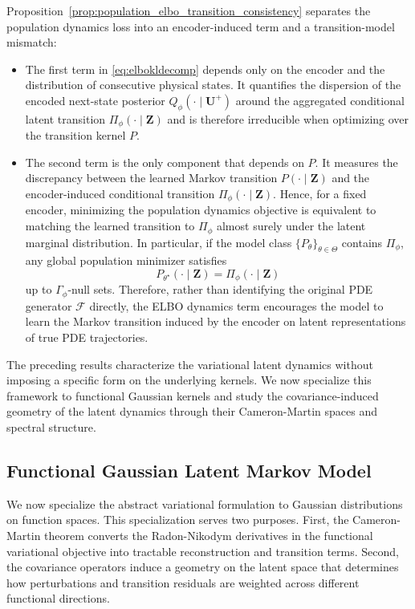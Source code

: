 \documentclass[11pt]{article}
\begin{document}
Proposition~\ref{prop:population_elbo_transition_consistency} separates the population dynamics loss into an encoder-induced term and a transition-model mismatch:
\begin{itemize}
\item The first term in \eqref{eq:elbokldecomp} depends only on the encoder and the distribution of consecutive physical states. It quantifies the dispersion of the encoded next-state posterior $Q_\phi(\cdot\mid\mathbf U^+)$ around the aggregated conditional latent transition $\Pi_\phi(\cdot\mid\mathbf Z)$ and is therefore irreducible when optimizing over the transition kernel $P$.

\item The second term is the only component that depends on $P$. It measures the discrepancy between the learned Markov transition $P(\cdot\mid\mathbf Z)$ and the encoder-induced conditional transition $\Pi_\phi(\cdot\mid\mathbf Z)$. Hence, for a fixed encoder, minimizing the population dynamics objective is equivalent to matching the learned transition to $\Pi_\phi$ almost surely under the latent marginal distribution. In particular, if the model class $\{P_\theta\}_{\theta\in\Theta}$ contains
$\Pi_\phi$, any global population minimizer satisfies
\[
    P_{\theta^\star}(\cdot\mid\mathbf Z)
    =
    \Pi_\phi(\cdot\mid\mathbf Z)
\]
up to $\Gamma_\phi$-null sets. Therefore, rather than identifying the original PDE generator $\mathcal F$ directly, the ELBO dynamics term encourages the model to learn the Markov transition induced by the encoder on latent representations of true PDE trajectories.
\end{itemize}

The preceding results characterize the variational latent dynamics without imposing a specific form on the underlying kernels. We now specialize this framework to
functional Gaussian kernels and study the covariance-induced geometry of the latent dynamics through their Cameron-Martin spaces and spectral structure.

\subsection{Functional Gaussian Latent Markov Model}
\label{sec:functional_gaussian_latent_markov}

We now specialize the abstract variational formulation to Gaussian distributions on function spaces. This specialization serves two purposes. First, the Cameron-Martin theorem converts the Radon-Nikodym derivatives in the functional variational objective into tractable reconstruction and transition terms. Second, the covariance operators induce a geometry on the latent space that determines how perturbations and transition residuals are weighted across different functional directions. 
\end{document}

